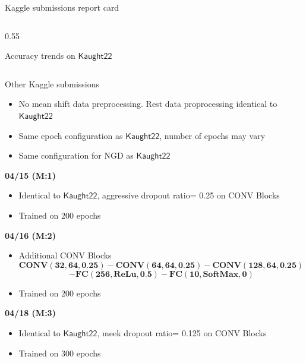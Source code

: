 \documentclass[20pt]{beamer}
\newlength{\twocolwid}
\newlength{\middlecolwid}
\newcommand*{\K}{\ensuremath{\mathsf{Kaught22}}}
\begin{document}
\begin{frame}[t]
\begin{columns}[t]
\begin{column}{\twocolwid}
\begin{alertblock}{Kaggle submissions report card}
\begin{columns}[t,totalwidth=\twocolwid]
\begin{column}{0.55\twocolwid}
\begin{block}{Accuracy trends on $\K$}
		\end{block}	
		
		\end{column}		
	\end{columns}
\end{alertblock}
\begin{columns}[t,totalwidth=\twocolwid] %

\begin{column}{\middlecolwid}\vspace{-.6in} %


\medskip
\bigskip
\bigskip
\bigskip
\begin{alertblock}{Other Kaggle submissions}
\bigskip
\bigskip
\begin{itemize}
\item No mean shift data preprocessing. Rest data proprocessing identical to $\K$
\item Same epoch configuration as $\K$, number of epochs may vary
\item Same configuration for NGD as $\K$
\end{itemize}

\bigskip
\bigskip
\bigskip
\textbf{04/15 (M:1)}
\begin{itemize}
\bigskip
\item Identical to $\K$, aggressive dropout ratio= 0.25 on CONV Blocks 
\item Trained on 200 epochs
\end{itemize}
\bigskip
\bigskip
\bigskip
\textbf{04/16 (M:2)}
\begin{itemize}
\bigskip
\item Additional CONV Blocks
\[
\textbf{CONV}(\textbf{32}, \textbf{64}, \textbf{0.25})-\textbf{CONV}(\textbf{64}, \textbf{64}, \textbf{0.25}) - \textbf{CONV}(\textbf{128}, \textbf{64}, \textbf{0.25}) -\]
\[ - \textbf{FC}(\textbf{256}, \textbf{ReLu}, \textbf{0.5}) - \textbf{FC}(\textbf{10}, \textbf{SoftMax}, \textbf{0})
\]
\item Trained on 200 epochs
\end{itemize}
\bigskip
\bigskip
\bigskip
\textbf{04/18 (M:3)}
\begin{itemize}
\bigskip
\item Identical to $\K$, meek dropout ratio= 0.125 on CONV Blocks 
\item Trained on 300 epochs
\end{itemize}
\bigskip
\bigskip



\end{alertblock}
\end{column}
\end{columns}
\end{column}
\end{columns}
\end{frame}
\end{document}
